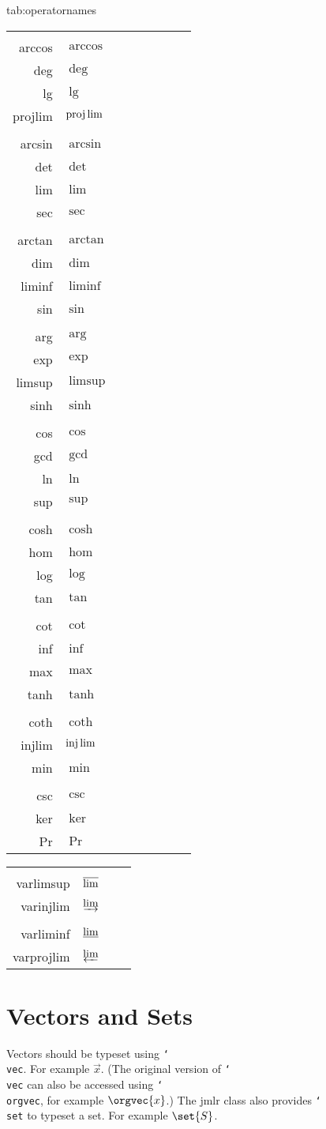 \documentclass[tablecaption=bottom,wcp]{jmlr} %
\newcommand{\cs}[1]{\texttt{\char`\\#1}}%
\begin{document}
\begin{table*}[htbp]
  \floatconts
  {tab:operatornames}%
  {\caption{Predefined Operator Names (taken from
      \textsf{amsmath} documentation)}}%
  {%
    \begin{tabular}{rlrlrlrl}
      \cs{arccos} & $\arccos$ & \cs{deg}    & $\deg$    & \cs{lg}     & $\lg$     & \cs{projlim} & $\projlim$ \\
      \cs{arcsin} & $\arcsin$ & \cs{det}    & $\det$    & \cs{lim}    & $\lim$    & \cs{sec}     & $\sec$     \\
      \cs{arctan} & $\arctan$ & \cs{dim}    & $\dim$    & \cs{liminf} & $\liminf$ & \cs{sin}     & $\sin$     \\
      \cs{arg}    & $\arg$    & \cs{exp}    & $\exp$    & \cs{limsup} & $\limsup$ & \cs{sinh}    & $\sinh$    \\
      \cs{cos}    & $\cos$    & \cs{gcd}    & $\gcd$    & \cs{ln}     & $\ln$     & \cs{sup}     & $\sup$     \\
      \cs{cosh}   & $\cosh$   & \cs{hom}    & $\hom$    & \cs{log}    & $\log$    & \cs{tan}     & $\tan$     \\
      \cs{cot}    & $\cot$    & \cs{inf}    & $\inf$    & \cs{max}    & $\max$    & \cs{tanh}    & $\tanh$    \\
      \cs{coth}   & $\coth$   & \cs{injlim} & $\injlim$ & \cs{min}    & $\min$                                \\
      \cs{csc}    & $\csc$    & \cs{ker}    & $\ker$    & \cs{Pr}     & $\Pr$
    \end{tabular}\par
    \begin{tabular}{rlrl}
      \cs{varlimsup} & $\varlimsup$
                     & \cs{varinjlim}  & $\varinjlim$  \\
      \cs{varliminf} & $\varliminf$
                     & \cs{varprojlim} & $\varprojlim$
    \end{tabular}
  }
\end{table*}

\section{Vectors and Sets}
\label{sec:vec}

Vectors should be typeset using \cs{vec}. For example $\vec{x}$.
(The original version of \cs{vec} can also be accessed using
\cs{orgvec}, for example $\orgvec{x}$.)
The \textsf{jmlr} class also provides \cs{set} to typeset a
set. For example $\set{S}$.
\end{document}
